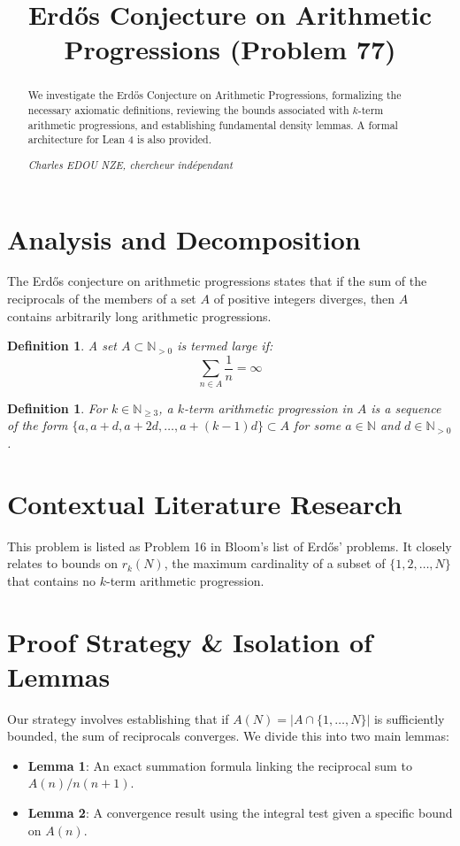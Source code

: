 \documentclass[11pt, a4paper]{article}
\title{Erdős Conjecture on Arithmetic Progressions (Problem 77)}
\author{}
\date{}
\newtheorem{definition}[theorem]{Definition}
\begin{document}
\maketitle

\begin{abstract}
We investigate the Erdős Conjecture on Arithmetic Progressions, formalizing the necessary axiomatic definitions, reviewing the bounds associated with $k$-term arithmetic progressions, and establishing fundamental density lemmas. A formal architecture for Lean 4 is also provided.
\vspace{1cm}
\begin{center}
\textit{Charles EDOU NZE, chercheur indépendant}
\end{center}
\end{abstract}

\section{Analysis and Decomposition}
The Erdős conjecture on arithmetic progressions states that if the sum of the reciprocals of the members of a set $A$ of positive integers diverges, then $A$ contains arbitrarily long arithmetic progressions.

\begin{definition}
A set $A \subset \mathbb{N}_{>0}$ is termed \textit{large} if:
$$ \sum_{n \in A} \frac{1}{n} = \infty $$
\end{definition}

\begin{definition}
For $k \in \mathbb{N}_{\ge 3}$, a $k$-term arithmetic progression in $A$ is a sequence of the form $\{a, a+d, a+2d, \dots, a+(k-1)d\} \subset A$ for some $a \in \mathbb{N}$ and $d \in \mathbb{N}_{>0}$.
\end{definition}


\section{Contextual Literature Research}
This problem is listed as Problem 16 in Bloom's list of Erdős' problems. It closely relates to bounds on $r_k(N)$, the maximum cardinality of a subset of $\{1, 2, \dots, N\}$ that contains no $k$-term arithmetic progression.

\section{Proof Strategy \& Isolation of Lemmas}
Our strategy involves establishing that if $A(N) = |A \cap \{1, \dots, N\}|$ is sufficiently bounded, the sum of reciprocals converges. We divide this into two main lemmas:
\begin{itemize}
\item \textbf{Lemma 1}: An exact summation formula linking the reciprocal sum to $A(n)/n(n+1)$.
\item \textbf{Lemma 2}: A convergence result using the integral test given a specific bound on $A(n)$.
\end{itemize}
\end{document}
